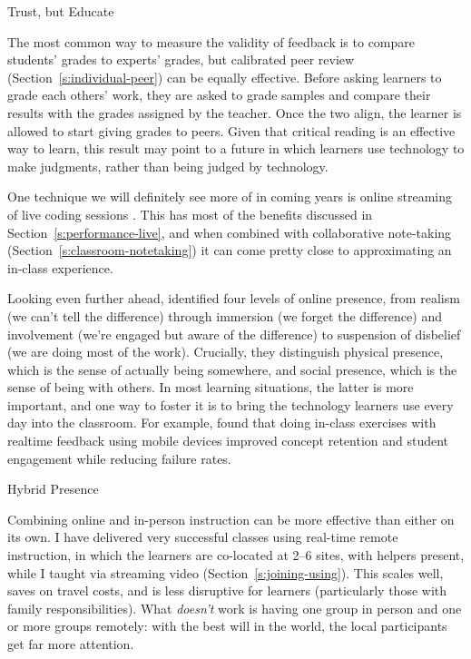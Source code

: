 \begin{aside}{Trust, but Educate}

The most common way to measure the validity of feedback is to compare
students' grades to experts' grades, but calibrated peer review
(Section~\ref{s:individual-peer}) can be equally effective. Before
asking learners to grade each others' work, they are asked to grade
samples and compare their results with the grades assigned by the
teacher. Once the two align, the learner is allowed to start giving
grades to peers. Given that critical reading is an effective way to
learn, this result may point to a future in which learners use
technology to make judgments, rather than being judged by technology.

\end{aside}

One technique we will definitely see more of in coming years is online
streaming of live coding sessions \cite{Haar2017}. This has most of
the benefits discussed in Section~\ref{s:performance-live}, and when
combined with collaborative note-taking
(Section~\ref{s:classroom-notetaking}) it can come pretty close to
approximating an in-class experience.

Looking even further ahead, \cite{Ijss2000} identified four levels of
online presence, from realism (we can't tell the difference) through
immersion (we forget the difference) and involvement (we're engaged but
aware of the difference) to suspension of disbelief (we are doing most
of the work). Crucially, they distinguish physical presence, which is
the sense of actually being somewhere, and social presence, which is the
sense of being with others. In most learning situations, the latter is
more important, and one way to foster it is to bring the technology
learners use every day into the classroom. For example,
\cite{Deb2018} found that doing in-class exercises with realtime
feedback using mobile devices improved concept retention and student
engagement while reducing failure rates.

\begin{aside}{Hybrid Presence}

Combining online and in-person instruction can be more effective than
either on its own. I have delivered very successful classes using
real-time remote instruction, in which the learners are co-located at
2--6 sites, with helpers present, while I taught via streaming video
(Section~\ref{s:joining-using}). This scales well, saves on travel
costs, and is less disruptive for learners (particularly those with
family responsibilities). What \emph{doesn't} work is having one group in
person and one or more groups remotely: with the best will in the
world, the local participants get far more attention.

\end{aside}

